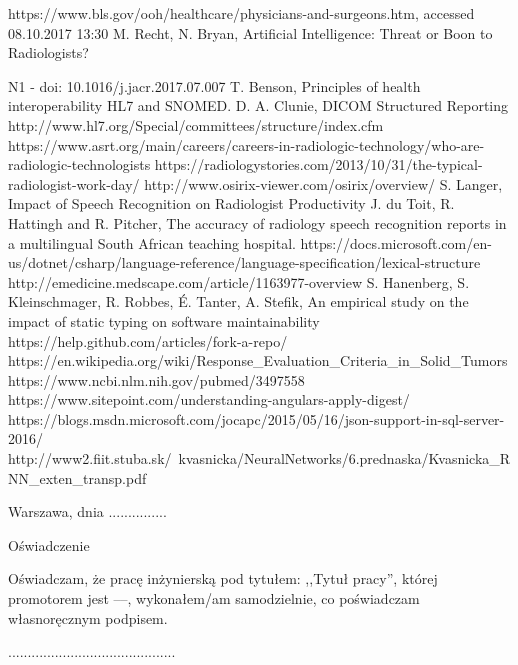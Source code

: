 \documentclass[12pt, twoside, openany]{report}
\theoremstyle{definition}
\begin{document}
\begin{thebibliography}{11}
 https://www.bls.gov/ooh/healthcare/physicians-and-surgeons.htm, accessed 08.10.2017 13:30
 M. Recht, N. Bryan, Artificial Intelligence: Threat or Boon to Radiologists?

N1  - doi: 10.1016/j.jacr.2017.07.007
 T. Benson, Principles of health interoperability HL7 and SNOMED.
 D. A. Clunie, DICOM Structured Reporting
 http://www.hl7.org/Special/committees/structure/index.cfm 
 https://www.asrt.org/main/careers/careers-in-radiologic-technology/who-are-radiologic-technologists
 https://radiologystories.com/2013/10/31/the-typical-radiologist-work-day/
http://www.osirix-viewer.com/osirix/overview/
S. Langer, Impact of Speech Recognition on Radiologist Productivity
 J. du Toit, R. Hattingh and R. Pitcher, The accuracy of radiology speech recognition
reports in a multilingual South African teaching hospital.
https://docs.microsoft.com/en-us/dotnet/csharp/language-reference/language-specification/lexical-structure
 http://emedicine.medscape.com/article/1163977-overview
    S. Hanenberg, S. Kleinschmager, R. Robbes, É. Tanter, A. Stefik, An empirical study on the impact of static typing on software maintainability
 https://help.github.com/articles/fork-a-repo/
https://en.wikipedia.org/wiki/Response\_Evaluation\_Criteria\_in\_Solid\_Tumors
 https://www.ncbi.nlm.nih.gov/pubmed/3497558
 https://www.sitepoint.com/understanding-angulars-apply-digest/
 https://blogs.msdn.microsoft.com/jocapc/2015/05/16/json-support-in-sql-server-2016/
http://www2.fiit.stuba.sk/~kvasnicka/NeuralNetworks/6.prednaska/Kvasnicka\_RNN\_exten\_transp.pdf
\end{thebibliography}
\clearpage
\begin{otherlanguage}{polish}
\pagestyle{empty}
\noindent Warszawa, dnia ...............
\vspace{5cm}
\begin{center}
\LARGE{Oświadczenie}
\end{center}
Oświadczam, że pracę inżynierską pod tytułem: ,,Tytuł pracy'', której promotorem jest ––, wykonałem/am samodzielnie, co poświadczam własnoręcznym podpisem.
\vspace{2cm}
\begin{flushright}
...........................................
\end{flushright}
\end{otherlanguage}
\end{document}
